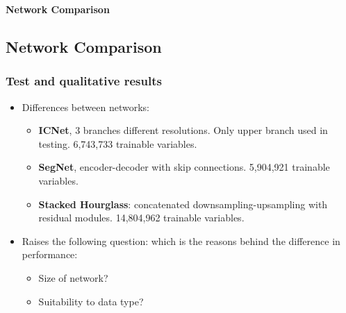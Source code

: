 \documentclass{beamer}
\begin{document}
\begin{frame}
\huge{\centerline{\textbf{Network Comparison}}}
\end{frame}
\subsection{Network Comparison}

\begin{frame}
\frametitle{Test and qualitative results}

\begin{table}[h!]
  \begin{center}
    \label{final:table1}
  \end{center}
\end{table}

\begin{itemize}
\item Differences between networks:
\begin{itemize}
\item \textbf{ICNet}, 3 branches different resolutions. Only upper branch used in testing. 6,743,733 trainable variables.
\item \textbf{SegNet}, encoder-decoder with skip connections. 5,904,921 trainable variables.
\item \textbf{Stacked Hourglass}: concatenated downsampling-upsampling with residual modules. 14,804,962 trainable variables.
\end{itemize}
\item Raises the following question: which is the reasons behind the difference in performance:
\begin{itemize}
\item Size of network?
\item Suitability to data type?
\end{itemize}
\end{itemize}

\end{frame}
\end{document}
